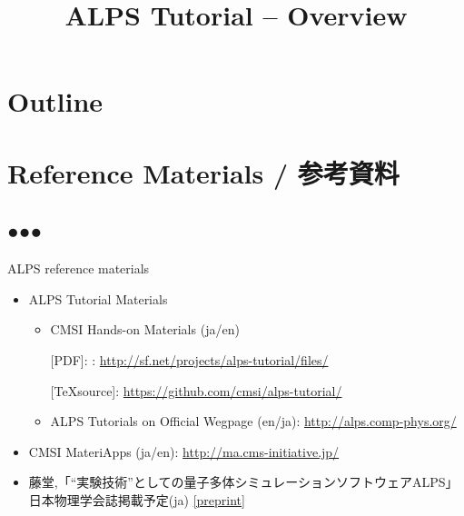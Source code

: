 
\title{ALPS Tutorial -- Overview}




\begin{frame}
  \titlepage
\end{frame}

\section*{Outline}
\begin{frame}[t,fragile]
  \tableofcontents
\end{frame}

\section{Reference Materials / 参考資料}
\subsection*{{\protect\color{red}●}{\protect\color{blue}●}{\protect\color{green}●}}

\begin{frame}[t,fragile]{ALPS reference materials}
  \begin{itemize}
    \setlength{\itemsep}{1em}
  \item ALPS Tutorial Materials
    \begin{itemize}
    \item CMSI Hands-on Materials (ja/en)
      
      [PDF]: : {\footnotesize \url{http://sf.net/projects/alps-tutorial/files/}}
      
      [\TeX source]: {\footnotesize \url{https://github.com/cmsi/alps-tutorial/}}
      
    \item ALPS Tutorials on Official Wegpage (en/ja): {\footnotesize \url{http://alps.comp-phys.org/}}
    \end{itemize}
  \item CMSI MateriApps (ja/en): {\footnotesize \url{http://ma.cms-initiative.jp/}}
  \item 藤堂,「``実験技術''としての量子多体シミュレーションソフトウェアALPS」日本物理学会誌掲載予定(ja) \href{http://exa.phys.s.u-tokyo.ac.jp/archive/alps-jps-2015.pdf}{\footnotesize [preprint]}
  \end{itemize}
\end{frame}

